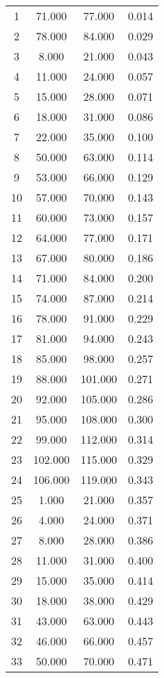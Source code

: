 % 
\begin{tabular}{cccc}
  \hline
  \hline
1 & 71.000 & 77.000 & 0.014 \\ 
  2 & 78.000 & 84.000 & 0.029 \\ 
  3 & 8.000 & 21.000 & 0.043 \\ 
  4 & 11.000 & 24.000 & 0.057 \\ 
  5 & 15.000 & 28.000 & 0.071 \\ 
  6 & 18.000 & 31.000 & 0.086 \\ 
  7 & 22.000 & 35.000 & 0.100 \\ 
  8 & 50.000 & 63.000 & 0.114 \\ 
  9 & 53.000 & 66.000 & 0.129 \\ 
  10 & 57.000 & 70.000 & 0.143 \\ 
  11 & 60.000 & 73.000 & 0.157 \\ 
  12 & 64.000 & 77.000 & 0.171 \\ 
  13 & 67.000 & 80.000 & 0.186 \\ 
  14 & 71.000 & 84.000 & 0.200 \\ 
  15 & 74.000 & 87.000 & 0.214 \\ 
  16 & 78.000 & 91.000 & 0.229 \\ 
  17 & 81.000 & 94.000 & 0.243 \\ 
  18 & 85.000 & 98.000 & 0.257 \\ 
  19 & 88.000 & 101.000 & 0.271 \\ 
  20 & 92.000 & 105.000 & 0.286 \\ 
  21 & 95.000 & 108.000 & 0.300 \\ 
  22 & 99.000 & 112.000 & 0.314 \\ 
  23 & 102.000 & 115.000 & 0.329 \\ 
  24 & 106.000 & 119.000 & 0.343 \\ 
  25 & 1.000 & 21.000 & 0.357 \\ 
  26 & 4.000 & 24.000 & 0.371 \\ 
  27 & 8.000 & 28.000 & 0.386 \\ 
  28 & 11.000 & 31.000 & 0.400 \\ 
  29 & 15.000 & 35.000 & 0.414 \\ 
  30 & 18.000 & 38.000 & 0.429 \\ 
  31 & 43.000 & 63.000 & 0.443 \\ 
  32 & 46.000 & 66.000 & 0.457 \\ 
  33 & 50.000 & 70.000 & 0.471 \\ 

\end{tabular}
